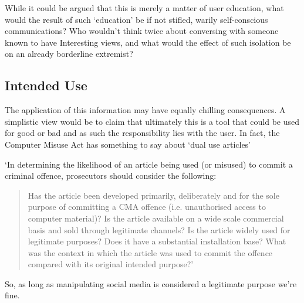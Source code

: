 While it could be argued that this is merely a matter of user education, what would the result of such `education' be if not stifled, warily self-conscious communications? Who wouldn't think twice about conversing with someone known to have Interesting views, and what would the effect of such isolation be on an already borderline extremist?

\subsection{Intended Use}
The application of this information may have equally chilling consequences. A simplistic view would be to claim that ultimately this is a tool that could be used for good or bad and as such the responsibility lies with the user.  In fact, the Computer Misuse Act has something to say about `dual use articles' \cite{misuseAct} \cite{lightBlue}

`In determining the likelihood of an article being used (or misused) to commit a criminal offence, prosecutors should consider the following:
\begin{quotation}
    Has the article been developed primarily, deliberately and for the sole purpose of committing a CMA offence (i.e. unauthorised access to computer material)?
    Is the article available on a wide scale commercial basis and sold through legitimate channels?
    Is the article widely used for legitimate purposes?
    Does it have a substantial installation base?
    What was the context in which the article was used to commit the offence compared with its original intended purpose?'
\end{quotation}

So, as long as manipulating social media\cite{spyOp} is considered a legitimate purpose we're fine.

